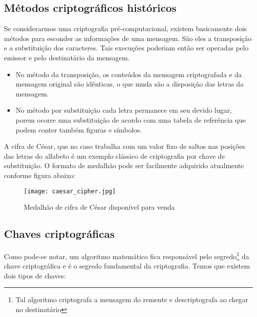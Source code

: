   \subsection{Métodos criptográficos históricos}
  
  Se considerarmos uma criptografia pré-computacional,  existem basicamente dois métodos para esconder as informações de uma mensagem. São eles a transposição e a substituição dos caracteres. Tais execuções poderiam então ser operadas pelo emissor e pelo destinatário da mensagem.
  \begin{itemize} 
  	\item No método da transposição, os conteúdos da mensagem criptografada e da mensagem original são idênticas, o que muda são a disposição das letras da mensagem.
  	\item No método por substituição cada letra permanece em seu devido lugar, porem ocorre uma substituição de acordo com uma tabela de referência que podem conter também figuras e símbolos.
  \end{itemize}

A cifra de César, que no caso trabalha com um valor fixo de saltos nas posições das letras do alfabeto é um exemplo clássico de criptografia por chave de substituição. O formato de medalhão pode ser facilmente adquirido atualmente conforme figura abaixo:

\begin{figure}[H]
	\centering
	\caption{Medalhão de cifra de César disponível para venda}
	\texttt{[image: caesar\_cipher.jpg]}\\
		
\end{figure}


  \subsection{Chaves criptográficas}
  Como pode-se notar, um algoritmo matemático fica responsável pelo segredo\footnote{Tal algoritmo criptografa a mensagem do remente e descriptografa ao chegar no destinatário} da chave criptográfica e é o segredo fundamental da criptografia. Temos que existem dois tipos de chaves:
  
